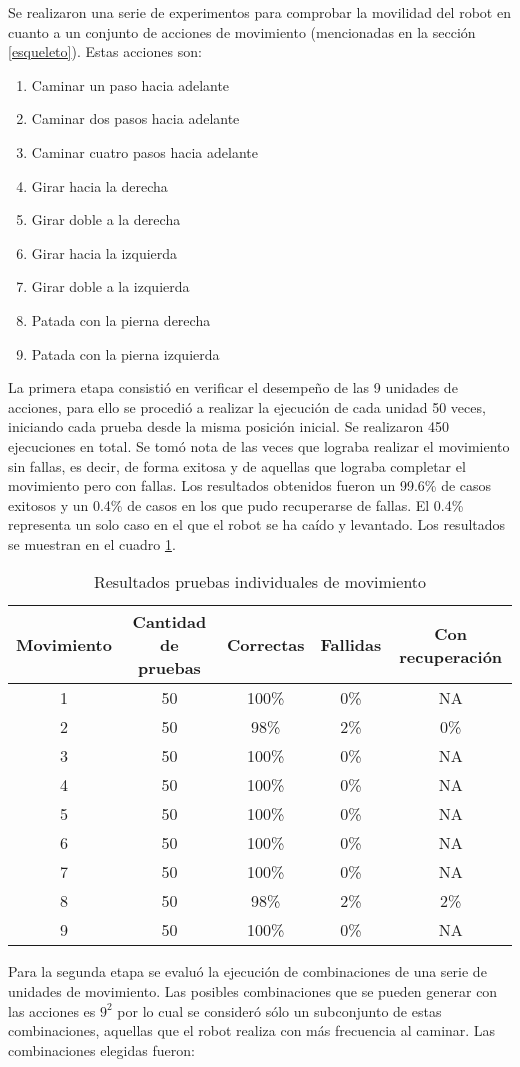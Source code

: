 Se realizaron una serie de experimentos para comprobar la movilidad del robot en cuanto a un conjunto de acciones de movimiento (mencionadas en la sección \ref{esqueleto}). Estas acciones son:
\begin{enumerate}

\setlength{\itemsep}{0pt}
\item Caminar un paso hacia adelante 
\item Caminar dos pasos hacia adelante 
\item Caminar cuatro pasos hacia adelante 
\item Girar hacia la derecha 
\item Girar doble a la derecha 
\item Girar hacia la izquierda 
\item Girar doble a la izquierda
\item Patada con la pierna derecha 
\item Patada con la pierna izquierda

\end{enumerate}
La primera etapa consistió en verificar el desempeño de las 9 unidades de acciones, para ello se procedió a realizar la ejecución de cada unidad 50 veces, iniciando cada prueba desde la misma posición inicial. Se realizaron 450 ejecuciones en total. Se tomó nota de las veces que lograba realizar el movimiento sin fallas, es decir, de forma exitosa y de aquellas que lograba completar el movimiento pero con fallas. Los resultados obtenidos fueron un 99.6\% de casos exitosos y un 0.4\% de casos en los que pudo recuperarse de fallas. El 0.4\% representa un solo caso en el que el robot se ha caído y levantado. Los resultados se muestran en el cuadro \ref{fig:individuales}.  

\begin{table}
\centering
\begin{tabular}{c c c c c}
\hline 
Movimiento & Cantidad de pruebas & Correctas & Fallidas & Con recuperaci\'on \\ 
\hline 
1 & 50 & 100\% & 0\% & NA \\ 
2 & 50 & 98\% & 2\% & 0\% \\ 
3 & 50 &  100\% & 0\% & NA \\ 
4 & 50 &  100\% & 0\% & NA \\ 
5 & 50 &  100\% & 0\% & NA \\ 
6 & 50 &  100\% & 0\% & NA \\ 
7 & 50 &  100\% & 0\% & NA \\ 
8 & 50 &   98\% & 2\% & 2\% \\ 
9 & 50 &  100\% & 0\% & NA \\ 
\hline 
\end{tabular} 
\caption{Resultados pruebas individuales de movimiento}
\label{fig:individuales}
\end{table}
Para la segunda etapa se evalu\'o la ejecuci\'on de combinaciones de una serie de unidades de movimiento. Las posibles combinaciones que se pueden generar con las acciones es $9 ^ 2$ por lo cual se consideró s\'olo un subconjunto de estas combinaciones, aquellas que el robot realiza con más frecuencia al caminar. Las combinaciones elegidas fueron: 

